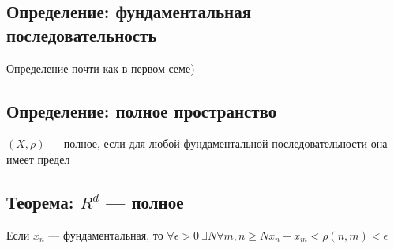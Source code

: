 \documentclass[12pt]{report} %
\begin{document}
\subsection*{Определение: фундаментальная последовательность}
Определение почти как в первом семе)

\subsection*{Определение: полное пространство}
$(X, \rho)$ --- полное, если для любой фундаментальной последовательности она имеет предел
\subsection*{Теорема: $R^d$ --- полное}
Если $x_n$ --- фундаментальная, то $\forall \epsilon > 0 \ \exists N \forall m,n \geqslant N x_n - x_m< \rho(n, m) < \epsilon$
\end{document}
